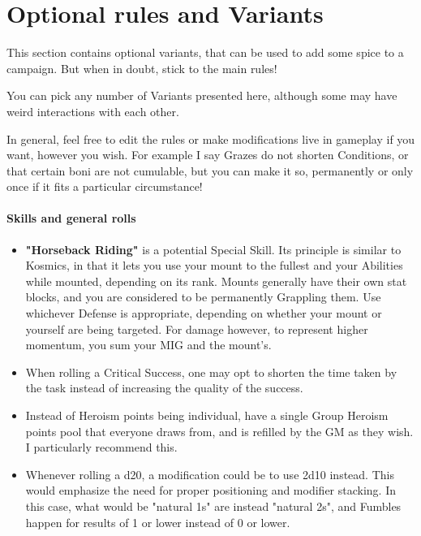 	

\section{Optional rules and Variants}

This section contains optional variants, that can be used to add some spice to a campaign. But when in doubt, stick to the main rules!

You can pick any number of Variants presented here, although some may have weird interactions with each other.

\begin{rpg-examplebox}
    In general, feel free to edit the rules or make modifications live in gameplay if you want, however you wish. For example I say Grazes do not shorten Conditions, or that certain boni are not cumulable, but you can make it so, permanently or only once if it fits a particular circumstance!
\end{rpg-examplebox}


\paragraph{Skills and general rolls}

\begin{itemize}
    \item \textbf{"Horseback Riding"} is a potential Special Skill. Its principle is similar to Kosmics, in that it lets you use your mount to the fullest and your Abilities while mounted, depending on its rank. Mounts generally have their own stat blocks, and you are considered to be permanently Grappling them. Use whichever Defense is appropriate, depending on whether your mount or yourself are being targeted. For damage however, to represent higher momentum, you sum your MIG and the mount's.
    \item When rolling a Critical Success, one may opt to shorten the time taken by the task instead of increasing the quality of the success.
    \item Instead of Heroism points being individual, have a single Group Heroism points pool that everyone draws from, and is refilled by the GM as they wish. I particularly recommend this.
    \item Whenever rolling a d20, a modification could be to use 2d10 instead. This would emphasize the need for proper positioning and modifier stacking. In this case, what would be "natural 1s" are instead "natural 2s", and Fumbles happen for results of 1 or lower instead of 0 or lower.
\end{itemize}

